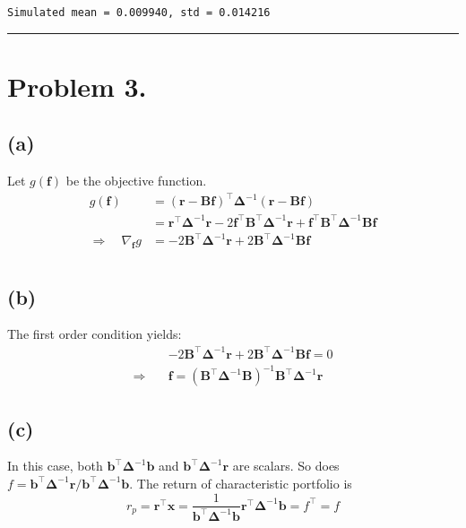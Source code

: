 \documentclass[11pt]{article}
\begin{document}
    \begin{Verbatim}[commandchars=\\\{\}]
Simulated mean = 0.009940, std = 0.014216

    \end{Verbatim}

\noindent\rule{16cm}{0.4pt}

\section{Problem 3.} 
\subsection{(a)} 
Let $g(\bm{f})$ be the objective function.
\begin{equation}
  \begin{split}
    g(\bm{f}) &= (\bm{r}-\bm{Bf})^{\top} \bm{\Delta}^{-1} (\bm{r}-\bm{Bf}) \\
  &= \bm{r}^{\top} \bm{\Delta}^{-1}\bm{r} - 2 \bm{f}^{\top} \bm{B}^{\top}\bm{\Delta}^{-1} \bm{r} + \bm{f}^{\top} \bm{B}^{\top}\bm{\Delta}^{-1}  \bm{Bf}\\
  \Rightarrow\quad \nabla_{\bm{f}} g &= -2\bm{B}^{\top}\bm{\Delta}^{-1} \bm{r} + 2\bm{B}^{\top}\bm{\Delta}^{-1}  \bm{Bf}\\
  \end{split}
\end{equation}
\subsection{(b)}  
The first order condition yields:
\begin{equation}
  \begin{split}
    &-2\bm{B}^{\top}\bm{\Delta}^{-1} \bm{r} + 2\bm{B}^{\top}\bm{\Delta}^{-1}  \bm{Bf} = 0 \\
    \Rightarrow \quad &\bm{f} = (\bm{B}^{\top}\bm{\Delta}^{-1} \bm{B})^{-1}\bm{B}^{\top}\bm{\Delta}^{-1} \bm{r}
  \end{split}
\end{equation}
\subsection{(c)}  
In this case, both $\bm{b}^{\top}\bm{\Delta}^{-1} \bm{b}$ and $\bm{b}^{\top} \bm{\Delta}^{-1}\bm{r}$ are scalars. So does $f = \bm{b}^{\top} \bm{\Delta}^{-1}\bm{r}/\bm{b}^{\top}\bm{\Delta}^{-1} \bm{b}$. The return of characteristic portfolio is
\begin{equation}
  r_p = \bm{r}^{\top}\bm{x} = \frac{1}{\bm{b}^{\top}\bm{\Delta}^{-1} \bm{b}} \bm{r}^{\top} \bm{\Delta}^{-1}\bm{b} = f^{\top} = f
\end{equation}
\end{document}
